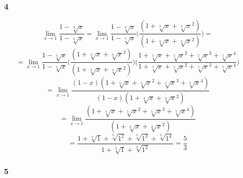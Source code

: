 \documentclass{article}
\begin{document}
\subsubsection*{4}

\begin{equation*}
    \lim_{x \to 1} \frac{1 - \sqrt[3]{x}}{1 - \sqrt[5]{x}} = \lim_{x \to 1} \frac{1 - \sqrt[3]{x}}{1 - \sqrt[5]{x}}\Bigg(\frac{(1 + \sqrt[3]{x} + \sqrt[3]{x}^2)}{(1 + \sqrt[3]{x} + \sqrt[3]{x}^2)}\Bigg) =
\end{equation*}
\begin{equation*}
    = \lim_{x \to 1} \frac{1 - \sqrt[3]{x}}{1 - \sqrt[5]{x}} \Bigg(\frac{(1 + \sqrt[3]{x} + \sqrt[3]{x}^2)}{(1 + \sqrt[3]{x} + \sqrt[3]{x}^2)}\Bigg) \Bigg(\frac{1 + \sqrt[5]{x} + \sqrt[5]{x}^2 + \sqrt[5]{x}^3 + \sqrt[5]{x}^4}{1 + \sqrt[5]{x} + \sqrt[5]{x}^2 + \sqrt[5]{x}^3 + \sqrt[5]{x}^4}\Bigg)
\end{equation*}
\begin{equation*}
    = \lim_{x \to 1} \frac{(1 - x)(1 + \sqrt[5]{x} + \sqrt[5]{x}^2 + \sqrt[5]{x}^3 + \sqrt[5]{x}^4)}{(1 - x)(1 + \sqrt[3]{x} + \sqrt[3]{x}^2)}
\end{equation*}
\begin{equation*}
    = \lim_{x \to 1} \frac{(1 + \sqrt[5]{x} + \sqrt[5]{x}^2 + \sqrt[5]{x}^3 + \sqrt[5]{x}^4)}{(1 + \sqrt[3]{x} + \sqrt[3]{x}^2)}
\end{equation*}
\begin{equation*}
    = \frac{1 + \sqrt[5]{1} + \sqrt[5]{1^2} + \sqrt[5]{1^3} + \sqrt[5]{1^4}}{1 + \sqrt[3]{1} + \sqrt[3]{1^2}} = \frac{5}{3}
\end{equation*}

\subsubsection*{5}
\end{document}
